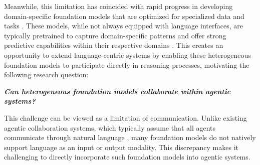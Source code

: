 Meanwhile, this limitation has coincided with rapid progress in developing domain-specific foundation models that are optimized for specialized data and tasks \cite{DBLP:journals/nn/MenonMBPJKJ26, DBLP:journals/corr/abs-2312-03014, DBLP:journals/corr/abs-2307-13721, DBLP:journals/corr/abs-2504-04011, DBLP:journals/corr/abs-2108-07258, huang2024foundation}. These models, while not always equipped with language interfaces, are typically pretrained to capture domain-specific patterns and offer strong predictive capabilities within their respective domains \cite{DBLP:journals/corr/abs-2212-12794, DBLP:journals/corr/abs-2405-04285, hamann2024foundation, herzog2025olmoearth}. This creates an opportunity to extend language-centric systems by enabling these heterogeneous foundation models to participate directly in reasoning processes, motivating the following research question:

\vspace{-3mm}
\begin{center}{
\centering\textit{\textbf{
Can heterogeneous foundation models collaborate within agentic systems?
}}
}

\end{center}
\vspace{-3mm}

This challenge can be viewed as a limitation of communication. Unlike existing agentic collaboration systems, which typically assume that all agents communicate through natural language \cite{DBLP:conf/ijcai/GuoCWCPCW024, DBLP:conf/iclr/HongZCZCWZWYLZR24, DBLP:conf/uist/ParkOCMLB23, DBLP:journals/corr/abs-2502-14321, DBLP:journals/corr/abs-2501-06322}, 
many foundation models do not natively support language as an input or output modality. This discrepancy makes it challenging to directly incorporate such foundation models into agentic systems.

